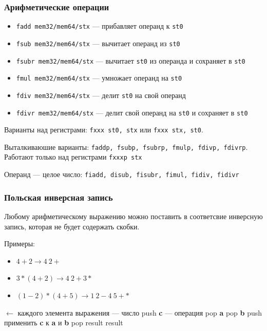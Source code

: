 \documentclass[utf8, russian, aspectratio=1610]{beamer}
\begin{document}
\begin{frame}
    \frametitle{Арифметические операции}
    \begin{itemize}
        \item {\tt fadd mem32/mem64/stx} --- прибавляет операнд к {\tt st0}
        \item {\tt fsub mem32/mem64/stx} --- вычитает операнд из {\tt st0}
        \item {\tt fsubr mem32/mem64/stx} --- вычитает {\tt st0} из операнда и сохраняет в {\tt st0}
        \item {\tt fmul mem32/mem64/stx} --- умножает операнд на {\tt st0}
        \item {\tt fdiv mem32/mem64/stx} --- делит {\tt st0} на свой операнд
        \item {\tt fdivr mem32/mem64/stx} --- делит свой операнд на {\tt st0} и сохраняет в {\tt st0}
    \end{itemize}

    Варианты над регистрами: {\tt fxxx st0, stx} или {\tt fxxx stx, st0}.

    Выталкиваюшие варианты: {\tt faddp, fsubp, fsubrp, fmulp, fdivp, fdivrp}. Работают только над регистрами
    {\tt fxxxp stx}

    Операнд --- целое число: {\tt fiadd, disub, fisubr, fimul, fidiv, fidivr}
\end{frame}

\begin{frame}
    \frametitle{Польская инверсная запись}

    Любому арифметическому выражению можно поставить в соответсвие инверсную запись, которая не будет содержать скобки.

    Примеры:
    \begin{itemize}
        \item $4 + 2 \rightarrow 4~2 +$
        \item $3*(4 + 2) \rightarrow 4~2 + 3 *$
        \item $(1 - 2)*(4 + 5) \rightarrow 1~2 - 4~5 + *$
    \end{itemize}

       \begin{codebox}
            \li {} $\leftarrow$ каждого элемента выражения
            \li \Do {} --- число
            \li     \Then push {\bf c}
            \li     \Else {} --- операция
            \li           \Then pop {\bf a}
            \li                 pop {\bf b}
            \li                 push применить {\bf c} к {\bf a} и {\bf b}
                          \End
                    \End
                \End
            \li pop result
            \li \Return result
        \end{codebox}
\end{frame}
\end{document}
